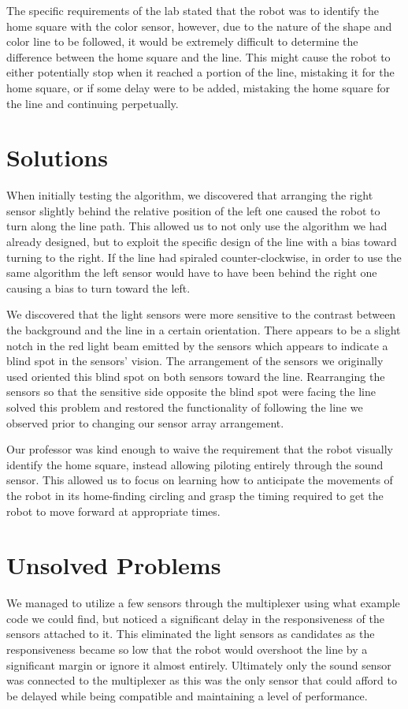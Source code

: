 \documentclass[journal]{../IEEEtran}
\begin{document}
The specific requirements of the lab stated that the robot was to identify the home square with the color sensor, however, due to the nature of the shape and color line to be followed, it would be extremely difficult to determine the difference between the home square and the line. This might cause the robot to either potentially stop when it reached a portion of the line, mistaking it for the home square, or if some delay were to be added, mistaking the home square for the line and continuing perpetually.


\section{Solutions}\label{S.solutions}

When initially testing the algorithm, we discovered that arranging the right sensor slightly behind the relative position of the left one caused the robot to turn along the line path. This allowed us to not only use the algorithm we had already designed, but to exploit the specific design of the line with a bias toward turning to the right. If the line had spiraled counter-clockwise, in order to use the same algorithm the left sensor would have to have been behind the right one causing a bias to turn toward the left.

We discovered that the light sensors were more sensitive to the contrast between the background and the line in a certain orientation. There appears to be a slight notch in the red light beam emitted by the sensors which appears to indicate a blind spot in the sensors' vision. The arrangement of the sensors we originally used oriented this blind spot on both sensors toward the line. Rearranging the sensors so that the sensitive side opposite the blind spot were facing the line solved this problem and restored the functionality of following the line we observed prior to changing our sensor array arrangement.

Our professor was kind enough to waive the requirement that the robot visually identify the home square, instead allowing piloting entirely through the sound sensor. This allowed us to focus on learning how to anticipate the movements of the robot in its home-finding circling and grasp the timing required to get the robot to move forward at appropriate times.

\section{Unsolved Problems}\label{S.unsolved}

We managed to utilize a few sensors through the multiplexer using what example code we could find, but noticed a significant delay in the responsiveness of the sensors attached to it. This eliminated the light sensors as candidates as the responsiveness became so low that the robot would overshoot the line by a significant margin or ignore it almost entirely. Ultimately only the sound sensor was connected to the multiplexer as this was the only sensor that could afford to be delayed while being compatible and maintaining a level of performance.
\end{document}
